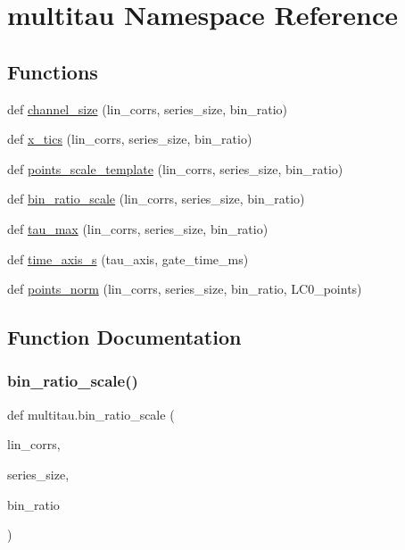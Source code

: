 \hypertarget{namespacemultitau}{}\section{multitau Namespace Reference}
\label{namespacemultitau}
\subsection*{Functions}
\begin{DoxyCompactItemize}
\item 
def \hyperlink{namespacemultitau_a1022c52950a892396ac45e7de5379e12}{channel\+\_\+size} (lin\+\_\+corrs, series\+\_\+size, bin\+\_\+ratio)
\item 
def \hyperlink{namespacemultitau_a775aea685fe55a6707400660fadf9c35}{x\+\_\+tics} (lin\+\_\+corrs, series\+\_\+size, bin\+\_\+ratio)
\item 
def \hyperlink{namespacemultitau_a265372a8ef814094424e2d787eb6304f}{points\+\_\+scale\+\_\+template} (lin\+\_\+corrs, series\+\_\+size, bin\+\_\+ratio)
\item 
def \hyperlink{namespacemultitau_a40d600d74abad18e71cccd90988a5cd7}{bin\+\_\+ratio\+\_\+scale} (lin\+\_\+corrs, series\+\_\+size, bin\+\_\+ratio)
\item 
def \hyperlink{namespacemultitau_a9516fc9217f79f4dc1c4f2dfb28c9b7a}{tau\+\_\+max} (lin\+\_\+corrs, series\+\_\+size, bin\+\_\+ratio)
\item 
def \hyperlink{namespacemultitau_aa907c1cffb653422b45f46332192b2a4}{time\+\_\+axis\+\_\+s} (tau\+\_\+axis, gate\+\_\+time\+\_\+ms)
\item 
def \hyperlink{namespacemultitau_a89bb2627a88498b04ebd436250310d71}{points\+\_\+norm} (lin\+\_\+corrs, series\+\_\+size, bin\+\_\+ratio, L\+C0\+\_\+points)
\end{DoxyCompactItemize}


\subsection{Function Documentation}
\mbox{\label{namespacemultitau_a40d600d74abad18e71cccd90988a5cd7}} 
\subsubsection{\texorpdfstring{bin\+\_\+ratio\+\_\+scale()}{bin\_ratio\_scale()}}
{\footnotesize\ttfamily def multitau.\+bin\+\_\+ratio\+\_\+scale (\begin{DoxyParamCaption}\item[{}]{lin\+\_\+corrs,  }\item[{}]{series\+\_\+size,  }\item[{}]{bin\+\_\+ratio }\end{DoxyParamCaption})}

